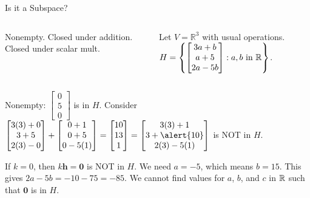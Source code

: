 \documentclass[xcolor=dvipsnames,aspectratio=169,t]{beamer}
\begin{document}
\begin{frame}{Is it a Subspace?}

\begin{columns}[T]

\column{0.35\tw}

\bb
\ii Nonempty.
\ii Closed under addition.
\ii Closed under scalar mult.
\ee

\column{0.65\tw}

Let $V = \mathbb{R}^3$ with usual operations. $\displaystyle H =  \left\{ \begin{bmatrix} 3a + b \\ a+5 \\ 2a-5b  \end{bmatrix} : a, b \mbox{ in } \mathbb{R}  \right\}$.

\end{columns}

\vspace{0.25in}

\pause
  \bb
  \item Nonempty: {\footnotesize $\begin{bmatrix} 0 \\ 5 \\ 0 \end{bmatrix}$ is in $H$.}
  \ii Consider {\footnotesize $\begin{bmatrix} 3(3) +0 \\ 3+5 \\ 2(3)-0 \end{bmatrix} + \begin{bmatrix} 0+1 \\ 0+5 \\ 0-5(1) \end{bmatrix} 
  = \begin{bmatrix} 10 \\ 13 \\ 1 \end{bmatrix}
  = \begin{bmatrix} 3(3) + 1 \\ 3 + \alert{10} \\ 2(3) - 5(1) \end{bmatrix}$}
  is \alert{NOT in $H$}. \bs
  \item If $k=0$, then $k \mathbf{h} = \mathbf{0}$ is \alert{NOT in $H$}.
    We need $a=-5$, which means $b=15$. This gives $2a-5b =-10 -75=-85$. 
    We \alert{cannot} find values for $a$, $b$, and $c$ in $\mathbb{R}$ such that \alert{$\mathbf{0}$ is in $H$.}
  \ee
\end{frame}
\end{document}
